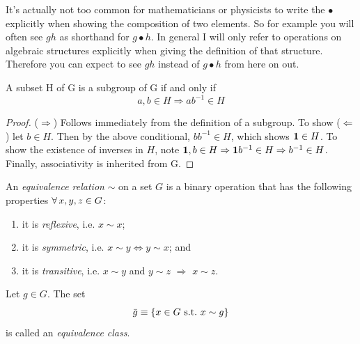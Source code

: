 It's actually not too common for mathematicians or physicists to write the
$\bullet$ explicitly when showing the composition of two elements. So for
example you will often see $gh$ as shorthand for $g\bullet h$. In general I will
only refer to operations on algebraic structures explicitly when giving the
definition of that structure. Therefore you can expect to see $gh$ instead of
$g\bullet h$ from here on out.

\begin{proposition}{}{}
  A subset H of G is a subgroup of G if and only if
  $$a,b\in H\Rightarrow ab^{-1}\in H$$
  \begin{proof}
    ($\Rightarrow$) Follows immediately from the definition of a subgroup. To 
    show ($\Leftarrow$) let $b\in H$. Then by the above conditional, $bb^{-1}
    \in H$, which shows ${\mathbf 1}\in H$. To show the existence of inverses in $H$, 
    note ${\mathbf 1},b\in H\Rightarrow {\mathbf 1} b^{-1}\in H\Rightarrow b^{-1}\in H$. 
    Finally, associativity is inherited from G.
  \end{proof}
\end{proposition}

An {\it equivalence relation} $\sim$ on a
set $G$ is a binary operation that has the following properties
$\operatorname{\forall} x,y,z\in G$:
\begin{enumerate}
  \item it is {\it reflexive}, i.e. $x\sim x$;
  \item it is {\it symmetric}, i.e.
        $x\sim y\Leftrightarrow y\sim x$; and
  \item it is {\it transitive}, i.e. $x\sim y$ and
        $y\sim z$ $\Rightarrow$ $x\sim z$.
\end{enumerate}
Let $g\in G$. The set
\begin{equation}
\bar{g}\equiv\{x\in G~\text{s.t.}~ x\sim g\}
\end{equation}
is called an 
{\it equivalence class}.


